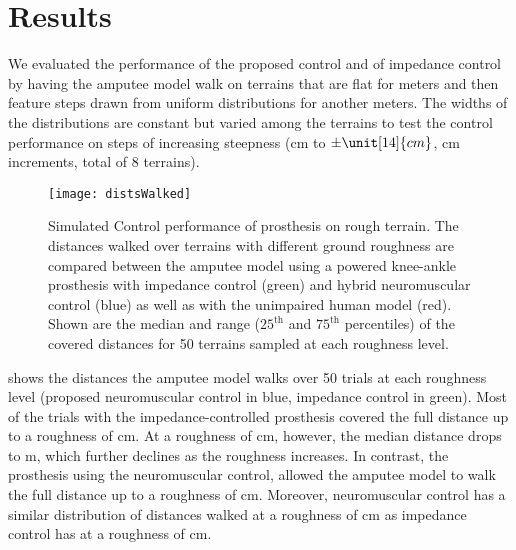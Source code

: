 \section{Results}\label{sec:completed_comparison_results}

We evaluated the performance of the proposed control and of impedance control by
having the amputee model walk on terrains that are flat for \unit[10]{meters}
and then feature steps drawn from uniform distributions for another
\unit[90]{meters}. The widths of the distributions are constant but varied among
the terrains to test the control performance on steps of increasing steepness
(\unit[0]{cm} to $\pm \unit[14]{cm}$, \unit[2]{cm} increments, total of 8
terrains). 

\begin{figure}[t]
    \centering
    \texttt{[image: distsWalked]}
    \caption[Simulated control performance of prosthesis on rough
    terrain]{Simulated Control performance of prosthesis on rough terrain. The
    distances walked over terrains with different ground roughness are compared
    between the amputee model using a powered knee-ankle prosthesis with
    impedance control (green) and hybrid neuromuscular control (blue) as well as
    with the unimpaired human model (red). Shown are the median and range
    ($25^\textrm{th}$ and $75^\textrm{th}$ percentiles) of the covered distances
    for 50 terrains sampled at each roughness level.}\label{fig:distsWalked}
\end{figure}
 shows the distances the amputee model walks over 50
trials at each roughness level (proposed neuromuscular control in blue,
impedance control in green). Most of the trials with the impedance-controlled
prosthesis covered the full distance up to a roughness of \unit[2]{cm}. At a
roughness of \unit[4]{cm}, however, the median distance drops to \unit[34]{m},
which further declines as the roughness increases. In contrast, the  prosthesis
using the neuromuscular control, allowed the amputee model to walk the full
distance up to a roughness of \unit[6]{cm}. Moreover, neuromuscular control has
a similar distribution of distances walked at a roughness of \unit[8]{cm} as
impedance control has at a roughness of \unit[4]{cm}.

